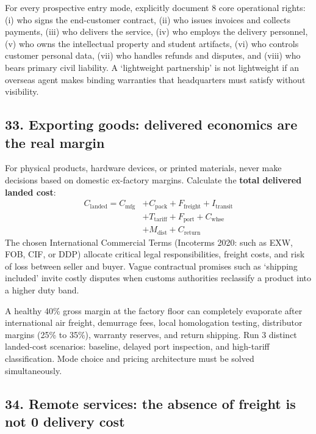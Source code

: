 For every prospective entry mode, explicitly document 8 core operational rights: (i) who signs the end-customer contract, (ii) who issues invoices and collects payments, (iii) who delivers the service, (iv) who employs the delivery personnel, (v) who owns the intellectual property and student artifacts, (vi) who controls customer personal data, (vii) who handles refunds and disputes, and (viii) who bears primary civil liability. A `lightweight partnership' is not lightweight if an overseas agent makes binding warranties that headquarters must satisfy without visibility.

\subsection{33. Exporting goods: delivered economics are the real margin}

For physical products, hardware devices, or printed materials, never make decisions based on domestic ex-factory margins. Calculate the \textbf{total delivered landed cost}:
\begin{equation}
\begin{aligned}
C_{\text{landed}} = C_{\text{mfg}} &+ C_{\text{pack}} + F_{\text{freight}} + I_{\text{transit}} \\
&+ T_{\text{tariff}} + F_{\text{port}} + C_{\text{whse}} \\
&+ M_{\text{dist}} + C_{\text{return}}
\end{aligned}
\end{equation}
The chosen International Commercial Terms (Incoterms 2020: such as EXW, FOB, CIF, or DDP) allocate critical legal responsibilities, freight costs, and risk of loss between seller and buyer. Vague contractual promises such as `shipping included' invite costly disputes when customs authorities reclassify a product into a higher duty band.

A healthy 40\% gross margin at the factory floor can completely evaporate after international air freight, demurrage fees, local homologation testing, distributor margins (25\% to 35\%), warranty reserves, and return shipping. Run 3 distinct landed-cost scenarios: baseline, delayed port inspection, and high-tariff classification. Mode choice and pricing architecture must be solved simultaneously.

\subsection{34. Remote services: the absence of freight is not 0 delivery cost}

